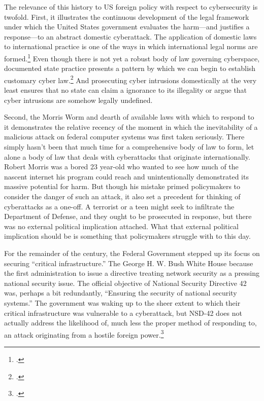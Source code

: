 \documentclass{memoir}
\begin{document}
\begin{refsegment}
The relevance of this history to US foreign policy with respect to cybersecurity is twofold. First, it illustrates the continuous development of the legal framework under which the United States government evaluates the harm---and justifies a response---to an abstract domestic cyberattack. The application of domestic laws to international practice is one of the ways in which international legal norms are formed.\footcite[p.~295]{deeks_international_2015}  Even though there is not yet a robust body of law governing cyberspace, documented state practice presents a pattern by which we can begin to establish customary cyber law.\footcite[p.~129]{brown_customary_2012} And prosecuting cyber intrusions domestically at the very least ensures that no state can claim a ignorance to its illegality or argue that cyber intrusions are somehow legally undefined.

Second, the Morris Worm and dearth of available laws with which to respond to it demonstrates the relative recency of the moment in which the inevitability of a malicious attack on federal computer systems was first taken seriously. There simply hasn't been that much time for a comprehensive body of law to form, let alone a body of law that deals with cyberattacks that originate internationally. Robert Morris was a bored 23 year-old who wanted to see how much of the nascent internet his program could reach and unintentionally demonstrated its massive potential for harm. But though his mistake primed policymakers to consider the danger of such an attack, it also set a precedent for thinking of cyberattacks as a one-off. A terrorist or a teen might seek to infiltrate the Department of Defense, and they ought to be prosecuted in response, but there was no external political implication attached. What that external political implication should be is something that policymakers struggle with to this day.

For the remainder of the  century, the Federal Government stepped up its focus on securing ``critical infrastructure.'' The George H. W. Bush White House because the first administration to issue a directive treating network security as a pressing national security issue. The official objective of National Security Directive 42 was, perhaps a bit redundantly, ``Ensuring the security of national security systems.'' The government was waking up to the sheer extent to which their critical infrastructure was vulnerable to a cyberattack, but NSD-42 does not actually address the likelihood of, much less the proper method of responding to, an attack originating from a hostile foreign power.\footcite{bush_national_1990}


\end{refsegment}
\end{document}
